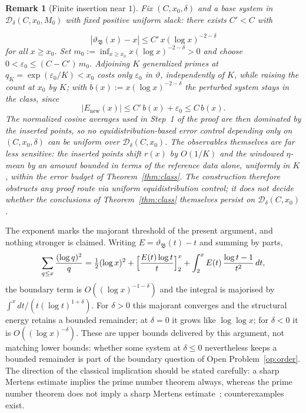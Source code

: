 \documentclass[11pt]{article}
\newtheorem*{remark}{Remark}
\newcommand{\Dclass}{\mathcal{D}_\delta}        %
\begin{document}
\begin{remark}[Finite insertion near $1$]
Fix $(C,x_0,\delta)$ and a base system in $\Dclass(C,x_0,M_0)$ with fixed
positive uniform slack: there exists $C'<C$ with

\[
|\vartheta_{\mathfrak{B}}(x)-x|\le C'\,x(\log x)^{-2-\delta}
\]
 for all
$x\ge x_0$. Set $m_0:=\inf_{x\ge x_0}x(\log x)^{-2-\delta}>0$ and choose
$0<\varepsilon_0\le(C-C')\,m_0$. Adjoining $K$ generalized primes at
$q_K=\exp(\varepsilon_0/K)<x_0$ costs only $\varepsilon_0$ in $\vartheta$,
independently of $K$, while raising the count at $x_0$ by $K$; with
$b(x):=x(\log x)^{-2-\delta}$ the perturbed system stays in the class,
since 
\[
|E_{\mathrm{new}}(x)|\le C'\,b(x)+\varepsilon_0\le C\,b(x).
\]
 The
normalized cosine averages used in Step~1 of the proof are then dominated
by the inserted points, so no equidistribution-based error control
depending only on $(C,x_0,\delta)$ can be uniform over $\Dclass(C,x_0)$.
The observables themselves are far less sensitive: the inserted points
shift $r(x)$ by $O(1/K)$ and the windowed $\eta$-mean by an amount bounded
in terms of the reference data alone, uniformly in $K$, within the error
budget of Theorem~\ref{thm:class}. The construction therefore obstructs
any proof route via uniform equidistribution control; it does not decide
whether the conclusions of Theorem~\ref{thm:class} themselves persist on
$\Dclass(C,x_0)$.
\end{remark}

The exponent marks the majorant threshold of the present argument, and
nothing stronger is claimed. Writing $E=\vartheta_{\mathfrak{B}}(t)-t$ and summing by
parts,
\[
\sum_{q\le x}\frac{(\log q)^2}{q}
=\tfrac12(\log x)^2+\Bigl[\frac{E(t)\log t}{t}\Bigr]_2^x
+\int_2^x E(t)\,\frac{\log t-1}{t^2}\,dt ,
\]
the boundary term is $O((\log x)^{-1-\delta})$ and the integral is majorised
by $\int^x dt/(t(\log t)^{1+\delta})$. For $\delta>0$ this majorant converges
and the structural energy retains a bounded remainder; at $\delta=0$ it grows
like $\log\log x$; for $\delta<0$ it is $O((\log x)^{-\delta})$. These are
upper bounds delivered by this argument, not matching lower bounds: whether
some system at $\delta\le0$ nevertheless keeps a bounded remainder is part of
the boundary question of Open Problem~\ref{op:order}. The direction of the classical implication should be stated
carefully: a sharp Mertens estimate implies the prime number theorem always,
whereas the prime number theorem does not imply a sharp Mertens
estimate~\cite{DebruyneVindas17}; counterexamples exist.
\end{document}
